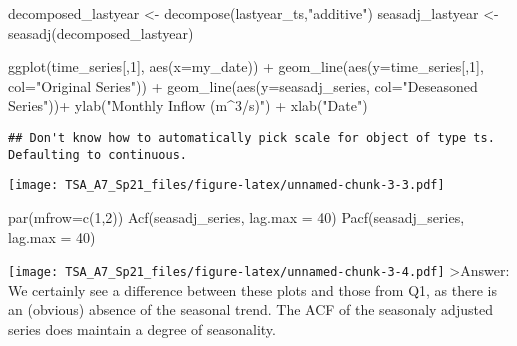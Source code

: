 \documentclass[
]{article}
\newenvironment{Shaded}{\begin{snugshade}}{\end{snugshade}}
\newcommand{\AttributeTok}[1]{\textcolor[rgb]{0.77,0.63,0.00}{#1}}
\newcommand{\DecValTok}[1]{\textcolor[rgb]{0.00,0.00,0.81}{#1}}
\newcommand{\FunctionTok}[1]{\textcolor[rgb]{0.00,0.00,0.00}{#1}}
\newcommand{\NormalTok}[1]{#1}
\newcommand{\OtherTok}[1]{\textcolor[rgb]{0.56,0.35,0.01}{#1}}
\newcommand{\SpecialCharTok}[1]{\textcolor[rgb]{0.00,0.00,0.00}{#1}}
\newcommand{\StringTok}[1]{\textcolor[rgb]{0.31,0.60,0.02}{#1}}
\begin{document}
\begin{Shaded}
\begin{Highlighting}[]
\NormalTok{decomposed\_lastyear }\OtherTok{\textless{}{-}} \FunctionTok{decompose}\NormalTok{(lastyear\_ts,}\StringTok{"additive"}\NormalTok{)}
\NormalTok{seasadj\_lastyear }\OtherTok{\textless{}{-}} \FunctionTok{seasadj}\NormalTok{(decomposed\_lastyear)}

\FunctionTok{ggplot}\NormalTok{(time\_series[,}\DecValTok{1}\NormalTok{], }\FunctionTok{aes}\NormalTok{(}\AttributeTok{x=}\NormalTok{my\_date)) }\SpecialCharTok{+}
  \FunctionTok{geom\_line}\NormalTok{(}\FunctionTok{aes}\NormalTok{(}\AttributeTok{y=}\NormalTok{time\_series[,}\DecValTok{1}\NormalTok{], }\AttributeTok{col=}\StringTok{"Original Series"}\NormalTok{)) }\SpecialCharTok{+}
  \FunctionTok{geom\_line}\NormalTok{(}\FunctionTok{aes}\NormalTok{(}\AttributeTok{y=}\NormalTok{seasadj\_series, }\AttributeTok{col=}\StringTok{"Deseasoned Series"}\NormalTok{))}\SpecialCharTok{+}
  \FunctionTok{ylab}\NormalTok{(}\StringTok{"Monthly Inflow (m\^{}3/s)"}\NormalTok{) }\SpecialCharTok{+}
  \FunctionTok{xlab}\NormalTok{(}\StringTok{"Date"}\NormalTok{)}
\end{Highlighting}
\end{Shaded}

\begin{verbatim}
## Don't know how to automatically pick scale for object of type ts. Defaulting to continuous.
\end{verbatim}

\texttt{[image: TSA\_A7\_Sp21\_files/figure-latex/unnamed-chunk-3-3.pdf]}

\begin{Shaded}
\begin{Highlighting}[]
\FunctionTok{par}\NormalTok{(}\AttributeTok{mfrow=}\FunctionTok{c}\NormalTok{(}\DecValTok{1}\NormalTok{,}\DecValTok{2}\NormalTok{))}
\FunctionTok{Acf}\NormalTok{(seasadj\_series, }\AttributeTok{lag.max =} \DecValTok{40}\NormalTok{)}
\FunctionTok{Pacf}\NormalTok{(seasadj\_series, }\AttributeTok{lag.max =} \DecValTok{40}\NormalTok{)}
\end{Highlighting}
\end{Shaded}

\texttt{[image: TSA\_A7\_Sp21\_files/figure-latex/unnamed-chunk-3-4.pdf]}
\textgreater Answer: We certainly see a difference between these plots
and those from Q1, as there is an (obvious) absence of the seasonal
trend. The ACF of the seasonaly adjusted series does maintain a degree
of seasonality.
\end{document}
